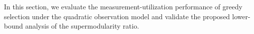 \documentclass[letterpaper, 10 pt, conference]{ieeeconf}  %
\begin{document}
%

In this section, we evaluate the measurement-utilization performance of greedy selection under the quadratic observation model and validate the proposed lower-bound analysis of the supermodularity ratio.
\end{document}
